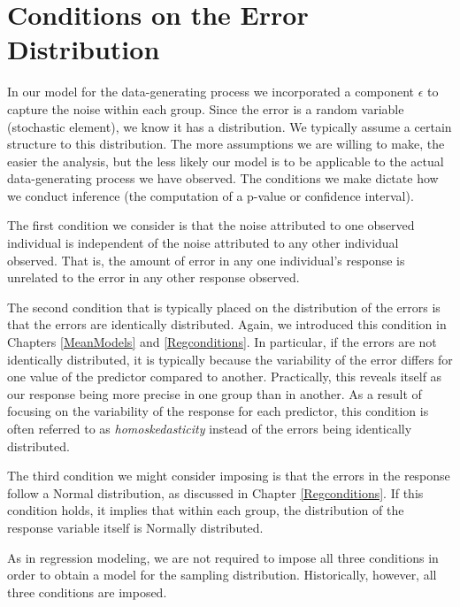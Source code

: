 \documentclass[]{book}
\theoremstyle{plain}
\theoremstyle{mydefn}
\theoremstyle{myexmpl}
\theoremstyle{remark}
\begin{document}
\section{Conditions on the Error
Distribution}\label{conditions-on-the-error-distribution-1}

In our model for the data-generating process we incorporated a component
\(\epsilon\) to capture the noise within each group. Since the error is
a random variable (stochastic element), we know it has a distribution.
We typically assume a certain structure to this distribution. The more
assumptions we are willing to make, the easier the analysis, but the
less likely our model is to be applicable to the actual data-generating
process we have observed. The conditions we make dictate how we conduct
inference (the computation of a p-value or confidence interval).

The first condition we consider is that the noise attributed to one
observed individual is independent of the noise attributed to any other
individual observed. That is, the amount of error in any one
individual's response is unrelated to the error in any other response
observed.

The second condition that is typically placed on the distribution of the
errors is that the errors are identically distributed. Again, we
introduced this condition in Chapters \ref{MeanModels} and
\ref{Regconditions}. In particular, if the errors are not identically
distributed, it is typically because the variability of the error
differs for one value of the predictor compared to another. Practically,
this reveals itself as our response being more precise in one group than
in another. As a result of focusing on the variability of the response
for each predictor, this condition is often referred to as
\emph{homoskedasticity} instead of the errors being identically
distributed.

The third condition we might consider imposing is that the errors in the
response follow a Normal distribution, as discussed in Chapter
\ref{Regconditions}. If this condition holds, it implies that within
each group, the distribution of the response variable itself is Normally
distributed.

As in regression modeling, we are not required to impose all three
conditions in order to obtain a model for the sampling distribution.
Historically, however, all three conditions are imposed.
\end{document}
